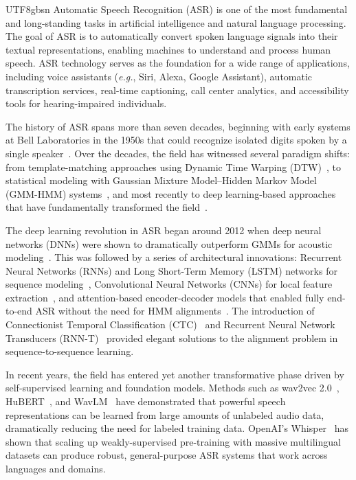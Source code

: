 \documentclass[12pt,a4paper]{article}
\newcommand{\eg}{\textit{e.g.}}
\begin{document}
\begin{CJK}{UTF8}{gbsn}
Automatic Speech Recognition (ASR) is one of the most fundamental and long-standing tasks in artificial intelligence and natural language processing. The goal of ASR is to automatically convert spoken language signals into their textual representations, enabling machines to understand and process human speech. ASR technology serves as the foundation for a wide range of applications, including voice assistants (\eg, Siri, Alexa, Google Assistant), automatic transcription services, real-time captioning, call center analytics, and accessibility tools for hearing-impaired individuals.

The history of ASR spans more than seven decades, beginning with early systems at Bell Laboratories in the 1950s that could recognize isolated digits spoken by a single speaker~\cite{davis1952auditory}. Over the decades, the field has witnessed several paradigm shifts: from template-matching approaches using Dynamic Time Warping (DTW)~\cite{vintsyuk1968speech}, to statistical modeling with Gaussian Mixture Model--Hidden Markov Model (GMM-HMM) systems~\cite{rabiner1989tutorial}, and most recently to deep learning-based approaches that have fundamentally transformed the field~\cite{hinton2012deep}.

The deep learning revolution in ASR began around 2012 when deep neural networks (DNNs) were shown to dramatically outperform GMMs for acoustic modeling~\cite{dahl2012context}. This was followed by a series of architectural innovations: Recurrent Neural Networks (RNNs) and Long Short-Term Memory (LSTM) networks for sequence modeling~\cite{hochreiter1997long}, Convolutional Neural Networks (CNNs) for local feature extraction~\cite{abdel2014convolutional}, and attention-based encoder-decoder models that enabled fully end-to-end ASR without the need for HMM alignments~\cite{chan2016listen}. The introduction of Connectionist Temporal Classification (CTC)~\cite{graves2006connectionist} and Recurrent Neural Network Transducers (RNN-T)~\cite{graves2012sequence} provided elegant solutions to the alignment problem in sequence-to-sequence learning.

In recent years, the field has entered yet another transformative phase driven by self-supervised learning and foundation models. Methods such as wav2vec 2.0~\cite{baevski2020wav2vec}, HuBERT~\cite{hsu2021hubert}, and WavLM~\cite{chen2022wavlm} have demonstrated that powerful speech representations can be learned from large amounts of unlabeled audio data, dramatically reducing the need for labeled training data. OpenAI's Whisper~\cite{radford2023robust} has shown that scaling up weakly-supervised pre-training with massive multilingual datasets can produce robust, general-purpose ASR systems that work across languages and domains.


\end{CJK}
\end{document}
